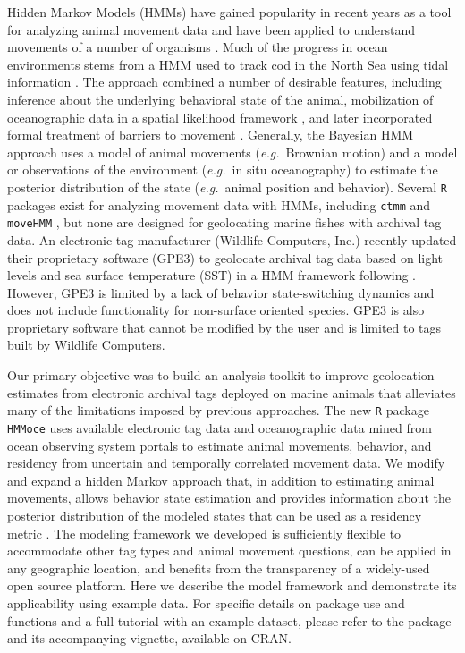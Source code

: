 Hidden Markov Models (HMMs) have gained popularity in recent years as a
tool for analyzing animal movement data and have been applied to
understand movements of a number of organisms
\citep{Holzmann2006, Thygesen2009a, Pedersen2011}. Much of the progress
in ocean environments stems from a HMM used to track cod in the North
Sea using tidal information \citep{Pedersen2008}. The approach combined
a number of desirable features, including inference about the underlying
behavioral state of the animal, mobilization of oceanographic data in a
spatial likelihood framework \citep{Nielsen2006}, and later incorporated
formal treatment of barriers to movement \citep{Pedersen2011}.
Generally, the Bayesian HMM approach uses a model of animal movements
(\emph{e.g.}~Brownian motion) and a model or observations of the environment
(\emph{e.g.}~in situ oceanography) to estimate the posterior distribution of
the state (\emph{e.g.}~animal position and behavior). Several \texttt{R}
packages exist for analyzing movement data with HMMs, including
\texttt{ctmm} \citep{Calabrese2016} and \texttt{moveHMM}
\citep{Michelot2016}, but none are designed for geolocating marine
fishes with archival tag data. An electronic tag manufacturer (Wildlife
Computers, Inc.) recently updated their proprietary software (GPE3) to
geolocate archival tag data based on light levels and sea surface
temperature (SST) in a HMM framework following \citet{Pedersen2008}.
However, GPE3 is limited by a lack of behavior state-switching dynamics
and does not include functionality for non-surface oriented species.
GPE3 is also proprietary software that cannot be modified by the user
and is limited to tags built by Wildlife Computers.

Our primary objective was to build an analysis toolkit to improve
geolocation estimates from electronic archival tags deployed on marine
animals that alleviates many of the limitations imposed by previous
approaches. The new \texttt{R} package \texttt{HMMoce} uses available
electronic tag data and oceanographic data mined from ocean observing
system portals to estimate animal movements, behavior, and residency
from uncertain and temporally correlated movement data. We modify and
expand a hidden Markov approach
\citep{Thygesen2009a, Pedersen2008, Pedersen2011} that, in addition to
estimating animal movements, allows behavior state estimation and
provides information about the posterior distribution of the modeled
states that can be used as a residency metric \citep{Pedersen2011}. The
modeling framework we developed is sufficiently flexible to accommodate
other tag types and animal movement questions, can be applied in any
geographic location, and benefits from the transparency of a widely-used
open source platform. Here we describe the model framework and
demonstrate its applicability using example data. For specific details
on package use and functions and a full tutorial with an example
dataset, please refer to the package and its accompanying vignette,
available on CRAN.

